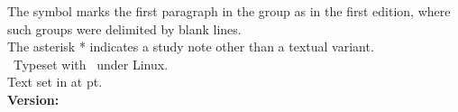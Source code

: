 \begin{center}
{The symbol \pc{} marks the first paragraph in the group as in the first edition, where such groups were delimited by blank lines.\\
The asterisk * indicates a study note other than a textual variant.\\[5pt]
\tux\ Typeset with \XeLaTeX\ under Linux.\\
Text set in \textbf{\urantiamainfont} at \urantiamainfontsize pt.\\[18pt]
\upshape\small\bfseries Version: \mytoday{}\\
}
\end{center}

\titleframe
